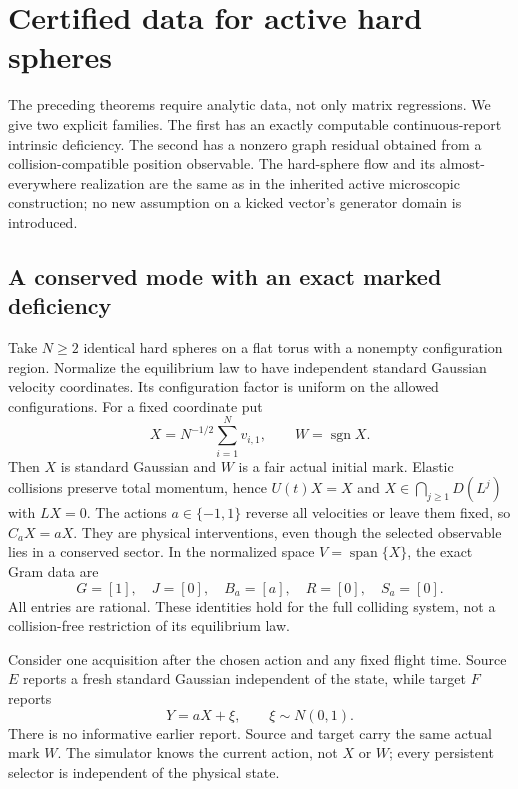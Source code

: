 \section{Certified data for active hard spheres}
\label{sec:v15-physical-data}
The preceding theorems require analytic data, not only matrix
regressions. We give two explicit families. The first has an exactly
computable continuous-report intrinsic deficiency. The second has a
nonzero graph residual obtained from a collision-compatible position
observable. The hard-sphere flow and its almost-everywhere realization
are the same as in the inherited active microscopic construction; no
new assumption on a kicked vector's generator domain is introduced.

\subsection{A conserved mode with an exact marked deficiency}
Take $N\ge2$ identical hard spheres on a flat torus with a nonempty
configuration region. Normalize the equilibrium law to have independent
standard Gaussian velocity coordinates. Its configuration factor is
uniform on the allowed configurations. For a fixed coordinate put
\[
 X=N^{-1/2}\sum_{i=1}^Nv_{i,1},\qquad W=\operatorname{sgn}X.
\]
Then $X$ is standard Gaussian and $W$ is a fair actual initial mark.
Elastic collisions preserve total momentum, hence $U(t)X=X$ and
$X\in\bigcap_{j\ge1}D(L^j)$ with $LX=0$. The actions $a\in\{-1,1\}$
reverse all velocities or leave them fixed, so $C_aX=aX$. They are
physical interventions, even though the selected observable lies in a
conserved sector. In the normalized space $V=\operatorname{span}\{X\}$,
the exact Gram data are
\begin{equation}\label{eq:v15-momentum-gram}
 G=[1],\quad J=[0],\quad B_a=[a],\quad R=[0],\quad S_a=[0].
\end{equation}
All entries are rational. These identities hold for the full colliding
system, not a collision-free restriction of its equilibrium law.

Consider one acquisition after the chosen action and any fixed flight
time. Source $E$ reports a fresh standard Gaussian independent of the
state, while target $F$ reports
\[
 Y=aX+\xi,\qquad \xi\sim N(0,1).
\]
There is no informative earlier report. Source and target carry the
same actual mark $W$. The simulator knows the current action, not $X$
or $W$; every persistent selector is independent of the physical state.

